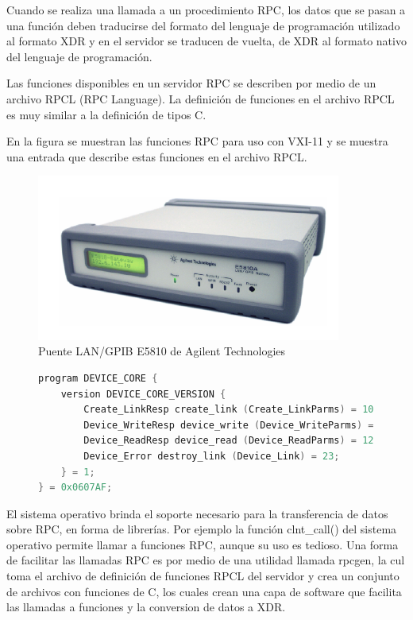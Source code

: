 \documentclass[paper=letter,oneside,fontsize=11pt, parskip=full]{scrartcl}
\begin{document}
		Cuando se realiza una llamada a un procedimiento RPC, los datos  que se pasan a una función deben traducirse del formato del lenguaje de programación utilizado al formato XDR y en el servidor se traducen de vuelta, de XDR al formato nativo del lenguaje de programación.
		
		Las funciones disponibles en un servidor RPC se describen por medio de un archivo RPCL (RPC Language). La definición de funciones en el archivo RPCL es muy similar a la definición de tipos  C.		
		
		En la figura se muestran las funciones RPC para uso con VXI-11 y se muestra una entrada que describe estas funciones en el archivo RPCL.
				
		\begin{figure}[!h]
			\begin{center}
				\includegraphics[width=10cm]{Imagenes/E5810.pdf}
				\caption{Puente LAN/GPIB E5810 de Agilent Technologies}
				\label{Fig:PuenteLanGpib}				
			\end{center}
		\end{figure}
	
		\begin{figure}
			\begin{lstlisting}[language=c]	
program DEVICE_CORE { 
	version DEVICE_CORE_VERSION { 
		Create_LinkResp create_link (Create_LinkParms) = 10; 
		Device_WriteResp device_write (Device_WriteParms) = 11; 
		Device_ReadResp device_read (Device_ReadParms) = 12; 
		Device_Error destroy_link (Device_Link) = 23; 
	} = 1; 
} = 0x0607AF;	
			\end{lstlisting}
		\end{figure}
		
		El sistema operativo brinda el soporte necesario para la transferencia de datos sobre RPC, en forma de librerías. Por ejemplo la función clnt\_call() del sistema operativo permite llamar a funciones RPC, aunque su uso es tedioso. Una forma de facilitar las llamadas RPC es por medio de una utilidad llamada rpcgen, la cul toma el archivo de definición de funciones RPCL del servidor y crea un conjunto de archivos con funciones de C, los cuales crean una capa de software que facilita las llamadas a funciones y la conversion de datos a XDR.
		
\end{document}
